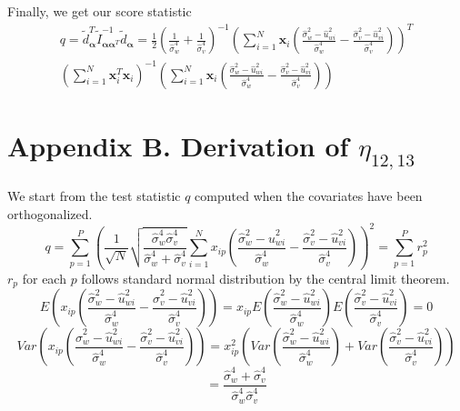 \documentclass[aap,authoryear, preprint]{imsart}
\numberwithin{equation}{section}
\theoremstyle{plain}
\begin{document}
\noindent Finally, we get our score statistic
\begin{equation}
    \begin{multlined}
    q = \tilde{d}_{\bm{\alpha}}^T \tilde{I}_{\bm{\alpha}\bm{\alpha}^T}^{-1}
    \tilde{d}_{\bm{\alpha}}
    =\frac{1}{2}\left( \frac{1}{\hat{\sigma}_w^4}+\frac{1}{\hat{\sigma}_v^4}\right)^{-1}
\left(\sum_{i=1}^{N} \bm{x}_{i} 
\left(
\frac{\hat{\sigma}_w^2-\hat{u}_{wi}^2}{\hat{\sigma}_w^4}- \frac{\hat{\sigma}_v^2-\hat{u}_{vi}^2}{\hat{\sigma}_v^4}
\right)
\right)^T \\
\left( \sum_{i=1}^{N} \bm{x}_i^T \bm{x}_i \right)^{-1}
\left(
\sum_{i=1}^{N} \bm{x}_{i} 
\left(
\frac{\hat{\sigma}_w^2-\hat{u}_{wi}^2}{\hat{\sigma}_w^4}- \frac{\hat{\sigma}_v^2-\hat{u}_{vi}^2}{\hat{\sigma}_v^4}
\right)
\right)
    \end{multlined}
\end{equation}


\section*{Appendix B. Derivation of $\eta_{12,13}$}
We start from the test statistic $q$ computed when the covariates have been orthogonalized.
$$q = \sum_{p=1}^{P}
 \left(\frac{1}{\sqrt{N}}
 \sqrt{\frac{\hat{\sigma}_w^4 \hat{\sigma}_v^4}{\hat{\sigma}_w^4 + \hat{\sigma}_v^4}}
 \sum_{i=1}^{N} x_{ip} \left( \frac{\hat{\sigma}_w^2 - \hat{u}_{wi}^2}{\hat{\sigma}_w^4}
 - \frac{\hat{\sigma}_v^2 - \hat{u}_{vi}^2}{\hat{\sigma}_v^4}
 \right)
\right)^2 = \sum_{p=1}^{P}r_p^2$$
$r_p$ for each $p$ follows standard normal distribution by the central limit theorem. 
$$E\left(x_{ip}\left( \frac{\hat{\sigma}_w^2 - \hat{u}_{wi}^2}{\hat{\sigma}_w^4}
 - \frac{\hat{\sigma}_v^2 - \hat{u}_{vi}^2}{\hat{\sigma}_v^4}
 \right)\right) = x_{ip} E\left( \frac{\hat{\sigma}_w^2 - \hat{u}_{wi}^2}{\hat{\sigma}_w^4} \right) E\left( \frac{\hat{\sigma}_v^2 - \hat{u}_{vi}^2}{\hat{\sigma}_v^4}
 \right) = 0$$
$$Var\left(x_{ip}\left( \frac{\hat{\sigma}_w^2 - \hat{u}_{wi}^2}{\hat{\sigma}_w^4}
- \frac{\hat{\sigma}_v^2 - \hat{u}_{vi}^2}{\hat{\sigma}_v^4}
\right)\right) = 
x_{ip}^2 \left( Var\left( \frac{\hat{\sigma}_w^2 - \hat{u}_{wi}^2}{\hat{\sigma}_w^4} \right)  + Var\left( \frac{\hat{\sigma}_v^2 - \hat{u}_{vi}^2}{\hat{\sigma}_v^4}\right)\right)$$
 $$ = \frac{\hat{\sigma}_w^4 + \hat{\sigma}_v^4}{\hat{\sigma}_w^4 \hat{\sigma}_v^4}$$
\end{document}
